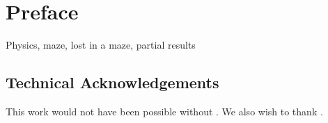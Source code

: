 \chapter*{Preface}
Physics, maze, lost in a maze, partial results

\section*{Technical Acknowledgements}
This work would not have been possible without \cite{SAN2010}. We also wish to thank
\cite{GEI2013}.